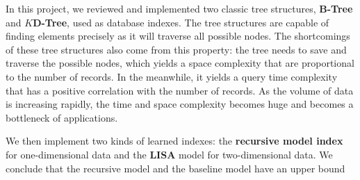In this project, we reviewed and implemented two classic tree structures, \textbf{B-Tree} and \textbf{$K$D-Tree}, used as database indexes. The tree structures are capable of finding elements precisely as it will traverse all possible nodes. The shortcomings of these tree structures also come from this property: the tree needs to save and traverse the possible nodes, which yields a space complexity that are proportional to the number of records. In the meanwhile, it yields a query time complexity that has a positive correlation with the number of records. As the volume of data is increasing rapidly, the time and space complexity becomes huge and becomes  a bottleneck of applications.

We then implement two kinds of learned indexes: the \textbf{recursive model index} for one-dimensional data and the \textbf{LISA} model for two-dimensional data. We conclude that the recursive model and the baseline model have an upper bound 
